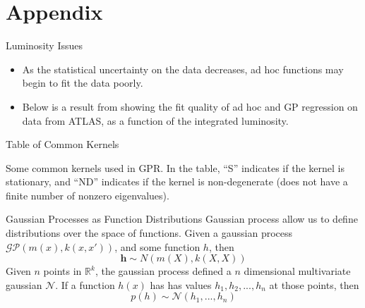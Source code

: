 \documentclass[10pt]{beamer}
\begin{document}
\section{Appendix}
\label{sec:appendix}


\begin{frame}{Luminosity Issues}
  \begin{itemize}
  \item As the statistical uncertainty on the data decreases, ad hoc functions may begin to fit the data poorly. 
  \item Below is a result from \cite{frate_modeling_2017} showing the fit quality of ad hoc and GP regression on data from ATLAS, as a function of the integrated luminosity.
  \end{itemize}
  \begin{center}
  \end{center}
\end{frame}

\begin{frame}{Table of Common Kernels}
  \begin{center}
  \end{center}
  \begin{center}
    Some common kernels used in GPR. In the table, ``S'' indicates if the kernel is stationary, and ``ND'' indicates if the kernel is non-degenerate (does not have a finite number of nonzero eigenvalues).
  \end{center}
\end{frame}

\begin{frame}{Gaussian Processes as Function Distributions}
  Gaussian process allow us to define distributions over the space of functions. Given a gaussian process $\mathcal{GP} \left( m(x) , k(x,x') \right)$, and some function $h$, then
  \begin{equation}
    \mathbf{h} \sim N(m(X) , k(X,X))
  \end{equation}
  Given $n$ points in $\mathbb{R}^{k}$, the gaussian process defined a $n$ dimensional multivariate gaussian $\mathcal{N}$. If a function $h(x)$ has has values $h_1,h_2,...,h_{n}$ at those points, then
  \begin{equation}
    p \left( h \right) \sim \mathcal{N}(h_{1}, ..., h_{n})
  \end{equation}

  \begin{center}
  \end{center}
\end{frame}
\end{document}

